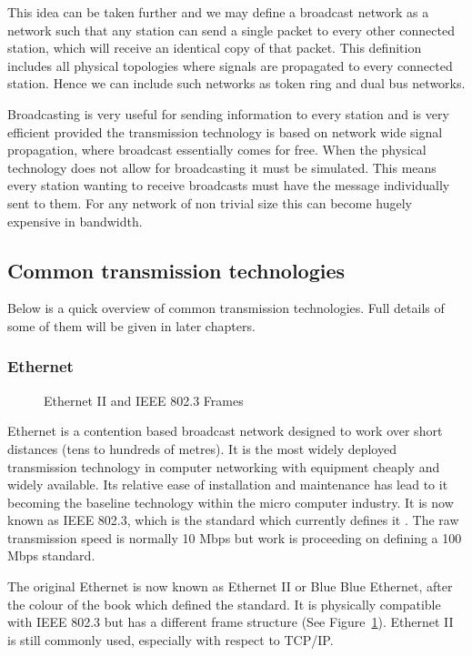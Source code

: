 This idea can be taken further and we may define a broadcast network
as a network such that any station can send a single packet to every
other connected station, which will receive an identical copy of that
packet.  This definition includes all physical topologies where
signals are propagated to every connected station.  Hence we can
include such networks as token ring and dual bus networks.

Broadcasting is very useful for sending information to every station
and is very efficient provided the transmission technology is based on
network wide signal propagation, where broadcast essentially comes for
free.  When the physical technology does not allow for broadcasting it
must be simulated.  This means every station wanting to receive
broadcasts must have the message individually sent to them.  For any
network of non trivial size this can become hugely expensive in
bandwidth.

\subsection{Common transmission technologies}

Below is a quick overview of common transmission technologies.  Full
details of some of them will be given in later chapters.

\subsubsection{Ethernet}

\begin{figure}
\leavevmode
{}
\caption{Ethernet II and IEEE 802.3 Frames}
\label{network:enet}
\end{figure}

Ethernet is a contention based broadcast network designed to work over
short distances (tens to hundreds of metres).  It is the most widely
deployed transmission technology in computer networking with equipment
cheaply and widely available.  Its relative ease of installation and
maintenance has lead to it becoming the baseline technology within the
micro computer industry.  It is now known as IEEE 802.3, which is the
standard which currently defines it \cite{Digital:Ethernet}
\cite{IEEE:Ethernet}.  The raw transmission speed is normally 10 Mbps
but work is proceeding on defining a 100 Mbps standard.

The original Ethernet is now known as Ethernet II or Blue Blue
Ethernet, after the colour of the book which defined the standard.  It
is physically compatible with IEEE 802.3 but has a different frame
structure (See Figure~\ref{network:enet}).  Ethernet II is still
commonly used, especially with respect to TCP/IP.

